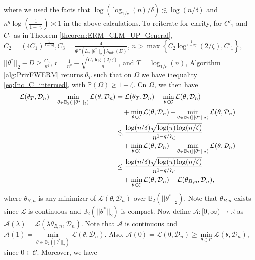 \documentclass{article}
\begin{document}
where we used the facts that $\log(\log_{1/c}(n)/\delta) \lesssim \log(n/\delta)$ and $n^q\log\left(\frac{1}{1 - \frac{1}{n^q}}\right) \asymp 1$ in the above calculations. To reiterate for clarity, for $C'_1$ and $C_1$ as in Theorem \ref{theorem:ERM_GLM_UP_General}, $C_2 = (4C_1)^{\frac{1}{1 - 2q}}, C_3 = \frac{4}{\Phi''(L_x||\theta^*||_2)\lambda_{\min}(\Sigma)}$, $n > \max\left\{C_2\log^{\frac{1}{1 - 2q}}(2/\zeta), C'_1\right\}$, $||\theta^*||_2 - D \geq \frac{C_3}{n^q}$, $r = \frac{1}{n^q} - \sqrt{\frac{C_1\log(2/\zeta)}{n}}$, and $T = \log_{1/c}(n)$, Algorithm \ref{alg:PrivFWERM} returns $\theta_T$ such that on $\Omega$ we have inequality \eqref{eq:Inc_C_intermed}, with $\mathbb{P}(\Omega) \geq 1 - \zeta$. On $\Omega$, we then have
\begin{align}
\label{EqnMinLoss}
\mathcal{L}(\theta_T, \mathcal{D}_n) - \mathop{\min}\limits_{\theta \in \mathbb{B}_2(||\theta^*||_2)}\mathcal{L}(\theta, \mathcal{D}_n) &= \mathcal{L}(\theta_T, \mathcal{D}_n) - \mathop{\min}\limits_{\theta \in \mathcal{C}}\mathcal{L}(\theta, \mathcal{D}_n) \notag\\
& \quad + \mathop{\min}\limits_{\theta \in \mathcal{C}}\mathcal{L}(\theta, \mathcal{D}_n) - \mathop{\min}\limits_{\theta \in \mathbb{B}_2(||\theta^*||_2)}\mathcal{L}(\theta, \mathcal{D}_n) \notag \\
& \lesssim \frac{\log(n/\delta)\sqrt{\log(n)\log(n/\zeta)}}{n^{1 - q/2}\epsilon} \notag\\
& \quad + \mathop{\min}\limits_{\theta \in \mathcal{C}}\mathcal{L}(\theta, \mathcal{D}_n) - \mathop{\min}\limits_{\theta \in \mathbb{B}_2(||\theta^*||_2)}\mathcal{L}(\theta, \mathcal{D}_n) \notag \\
&\leq \frac{\log(n/\delta)\sqrt{\log(n)\log(n/\zeta)}}{n^{1 - q/2}\epsilon} \notag\\
& \quad + \mathop{\min}\limits_{\theta \in \mathcal{C}}\mathcal{L}(\theta, \mathcal{D}_n) - \mathcal{L}(\theta_{B, n}, \mathcal{D}_n),
\end{align}
where $\theta_{B, n}$ is any minimizer of $\mathcal{L}(\theta, \mathcal{D}_n)$ over $\mathbb{B}_2(||\theta^*||_2)$. Note that $\theta_{B, n}$ exists since $\mathcal{L}$ is continuous and $\mathbb{B}_2(||\theta^*||_2)$ is compact. Now define $\mathcal{A} : [0, \infty) \rightarrow \mathbb{R}$ as $\mathcal{A}(\lambda) = \mathcal{L}(\lambda\theta_{B, n}, \mathcal{D}_n)$. Note that $\mathcal{A}$ is continuous and $\mathcal{A}(1) = \mathop{\min}\limits_{\theta \in \mathbb{B}_2(||\theta^*||_2)}\mathcal{L}(\theta, \mathcal{D}_n)$. Also, $\mathcal{A}(0) = \mathcal{L}(0, \mathcal{D}_n) \geq \mathop{\min}\limits_{\theta \in \mathcal{C}}\mathcal{L}(\theta, \mathcal{D}_n)$, since $0 \in \mathcal{C}$. Moreover, we have
\end{document}
